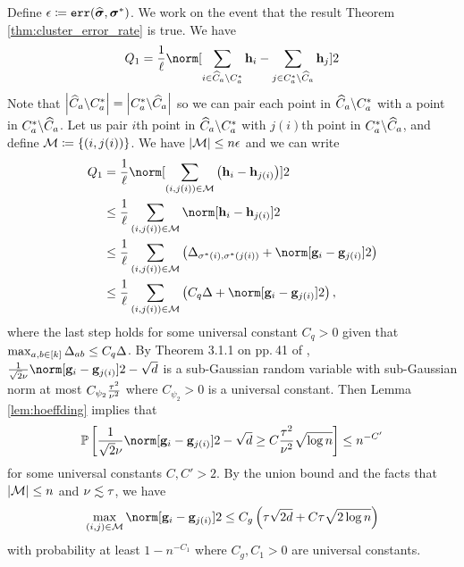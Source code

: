 Define $\epsilon\coloneqq\operatorname*{\texttt{err}}(\widehat{\boldsymbol{\sigma}},\boldsymbol{\sigma}^{*})$. We work
on the event that the result Theorem \ref{thm:cluster_error_rate}
is true. We have 
\[
Q_{1}=\frac{1}{\size}\norm[\sum_{i\in\clustest a\backslash\clustset a}\h_{i}-\sum_{j\in\clustset a\backslash\clustest a}\h_{j}]2
\]
Note that $\left|\widehat{C}_{a}\backslash C_{a}^{*}\right|=\left|C_{a}^{*}\backslash\widehat{C}_{a}\right|$
so we can pair each point in $\widehat{C}_{a}\backslash C_{a}^{*}$ with
a point in $C_{a}^{*}\backslash\widehat{C}_{a}$. Let us pair $i$th
point in $\widehat{C}_{a}\backslash C_{a}^{*}$ with $j(i)$th point
in $C_{a}^{*}\backslash\widehat{C}_{a}$, and define $\mathcal{M}\coloneqq\left\{ \left(i,j(i)\right)\right\} $.
We have $\left|\mathcal{M}\right|\le n\epsilon$ and we can write 
\begin{align*}
Q_{1} & =\frac{1}{\size}\norm[\sum_{(i,j(i))\in\calM}\left(\h_{i}-\h_{j(i)}\right)]2\\
 & \le\frac{1}{\size}\sum_{(i,j(i))\in\calM}\norm[\h_{i}-\h_{j(i)}]2\\
 & \le\frac{1}{\size}\sum_{(i,j(i))\in\calM}\left(\minsep_{\labelstar(i),\labelstar(j(i))}+\norm[\g_{i}-\g_{j(i)}]2\right)\\
 & \le\frac{1}{\size}\sum_{(i,j(i))\in\calM}\left(C_{q}\minsep+\norm[\g_{i}-\g_{j(i)}]2\right),
\end{align*}
where the last step holds for some universal constant $C_{q}>0$ given
that $\max_{a,b\in\left[k\right]}\Delta_{ab}\le C_{q}\Delta$.
By Theorem 3.1.1 on pp.$\ $41 of \citet{vershynin2017high}, $\frac{1}{\sqrt{2}\std}\norm[\g_{i}-\g_{j(i)}]2-\sqrt{\vecdim}$
is a sub-Gaussian random variable with sub-Gaussian norm at most $C_{\psi_{2}}\frac{\tau^{2}}{\nu^{2}}$
where $C_{\psi_{2}}>0$ is a universal constant. Then Lemma \ref{lem:hoeffding}
implies that 
\[
\P\left[\frac{1}{\sqrt{2}\std}\norm[\g_{i}-\g_{j(i)}]2-\sqrt{\vecdim}\ge C\frac{\sgnorm^{2}}{\std^{2}}\sqrt{\log\num}\right]\le\num^{-C'}
\]
for some universal constants $C,C'>2$. By the union bound and the
facts that $\left|\mathcal{M}\right|\le n$ and $\nu\lesssim\tau$,
we have 
\[
\max_{(i,j)\in\calM}\norm[\g_{i}-\g_{j(i)}]2\le C_{g}\left(\sgnorm\sqrt{2\vecdim}+C\sgnorm\sqrt{2\log\num}\right)
\]
with probability at least $1-n^{-C_{1}}$ where $C_{g},C_{1}>0$ are
universal constants. 

